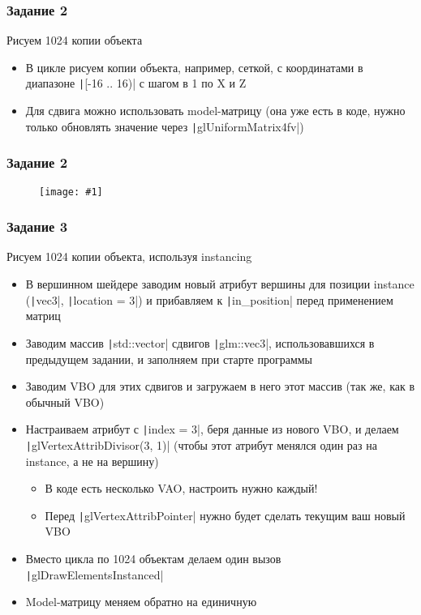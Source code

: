 \documentclass{beamer}
\newcommand{\slideimage}[1]{
  \begin{figure}
    \begin{adjustbox}{width=\textwidth, totalheight=\textheight-2\baselineskip-2\baselineskip,keepaspectratio}
      \texttt{[image: \#1]}
    \end{adjustbox}
  \end{figure}
}
\begin{document}
\begin{frame}[fragile]
\frametitle{Задание 2}
Рисуем 1024 копии объекта
\begin{itemize}
\item В цикле рисуем копии объекта, например, сеткой, с координатами в диапазоне \texttt|[-16 .. 16)| с шагом в 1 по X и Z
\item Для сдвига можно использовать model-матрицу (она уже есть в коде, нужно только обновлять значение через \texttt|glUniformMatrix4fv|)
\end{itemize}
\end{frame}

\begin{frame}
\frametitle{Задание 2}
\slideimage{2.png}
\end{frame}

\begin{frame}[fragile]
\fontsize{10pt}{10pt}
\selectfont
\frametitle{Задание 3}
Рисуем 1024 копии объекта, используя instancing
\begin{itemize}
\item В вершинном шейдере заводим новый атрибут вершины для позиции instance (\texttt|vec3|, \texttt|location = 3|) и прибавляем к \texttt|in_position| перед применением матриц
\item Заводим массив \texttt|std::vector| сдвигов \texttt|glm::vec3|, использовавшихся в предыдущем задании, и заполняем при старте программы
\item Заводим VBO для этих сдвигов и загружаем в него этот массив (так же, как в обычный VBO)
\item Настраиваем атрибут с \texttt|index = 3|, беря данные из нового VBO, и делаем \texttt|glVertexAttribDivisor(3, 1)| (чтобы этот атрибут менялся один раз на instance, а не на вершину)
\begin{itemize}
\fontsize{10pt}{10pt}
\selectfont
\item В коде есть несколько VAO, настроить нужно каждый!
\item Перед \texttt|glVertexAttribPointer| нужно будет сделать текущим ваш новый VBO
\end{itemize}
\item Вместо цикла по 1024 объектам делаем один вызов \texttt|glDrawElementsInstanced|
\item Model-матрицу меняем обратно на единичную
\end{itemize}
\end{frame}
\end{document}
